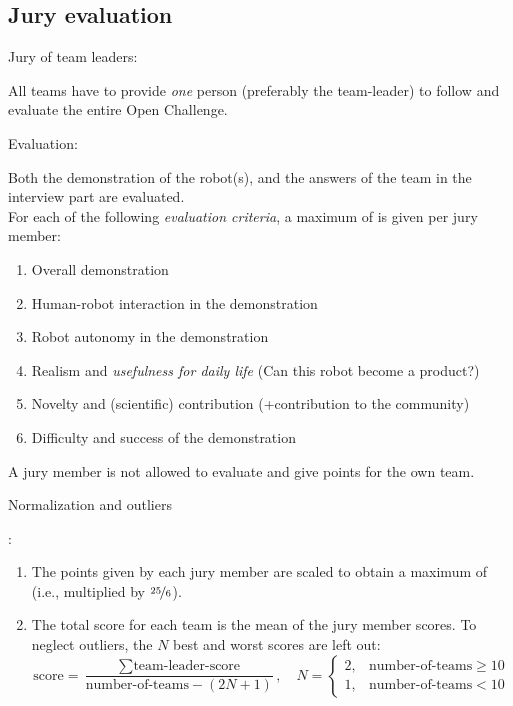 \subsection{Jury evaluation}
\begin{enumerate}
  {\bf\item Jury of team leaders:} All teams have to provide \emph{one} person 
  (preferably the team-leader) to follow and evaluate the entire Open Challenge.
  {\bf\item Evaluation:} Both the demonstration of the robot(s), and the answers of the team in the interview part are evaluated.\\ 
  For each of the following \emph{evaluation criteria}, a maximum of  is given per jury member:
  \begin{enumerate}
  \item Overall demonstration
  \item Human-robot interaction in the demonstration
  \item Robot autonomy in the demonstration
  \item Realism and \emph{usefulness for daily life} (Can this robot become a product?)
  \item Novelty and (scientific) contribution (+contribution to the community)
  \item Difficulty and success of the demonstration 
  \end{enumerate}
  A jury member is not allowed to evaluate and give points for the own team.
  {\bf\item Normalization and outliers}: 
  \begin{enumerate}
    \item The points given by each jury member are scaled to obtain a maximum of  (i.e., multiplied by $\nicefrac{25}{6}$). 
    \item The total score for each team is the mean of the jury member scores.
      To neglect outliers, the $N$ best and worst scores are left out:
      $$\mbox{score} = \frac{\sum\mbox{team-leader-score}}{\mbox{number-of-teams} - (2N+1)},
      \quad N=\begin{cases}2, & \mbox{number-of-teams} \ge 10\\1, & \mbox{number-of-teams} < 10 \end{cases}$$
    \end{enumerate}
\end{enumerate}

